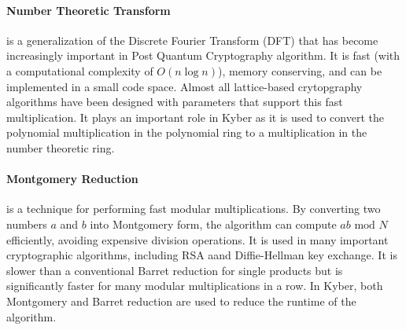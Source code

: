\paragraph{Number Theoretic Transform} is a generalization of the Discrete Fourier Transform (DFT) that has become 
increasingly important in Post Quantum Cryptography algorithm. It is fast (with a computational complexity of 
$O(n\log n)$), memory conserving, and can be implemented in a small code space. 
Almost all lattice-based crytopgraphy algorithms have been designed with parameters that support this 
fast multiplication. 
It plays an important role in Kyber as it is used to convert the polynomial multiplication in the polynomial ring to 
a multiplication in the number theoretic ring. 

\paragraph{Montgomery Reduction} is a technique for performing fast modular multiplications. By converting two numbers
$a$ and $b$ into Montgomery form, the algorithm can compute $ab \text{ mod } N$ efficiently, avoiding expensive division
operations. It is used in many important cryptographic algorithms, including RSA aand Diffie-Hellman key exchange. 
It is slower than a conventional Barret reduction for single products but is significantly faster for many 
modular multiplications in a row. In Kyber, both Montgomery and Barret reduction are used to reduce the runtime of the
algorithm.